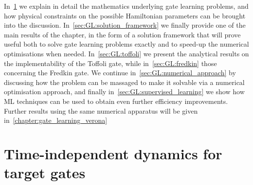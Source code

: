 In~\cref{sec:GL:problem_details} we explain in detail the mathematics underlying gate learning problems, and how physical constraints on the possible Hamiltonian parameters can be brought into the discussion. In~\cref{sec:GL:solution_framework} we finally provide one of the main results of the chapter, in the form of a solution framework that will prove useful both to solve gate learning problems exactly and to speed-up the numerical optimisations when needed. In~\cref{sec:GL:toffoli} we present the analytical results on the implementability of the Toffoli gate, while in~\cref{sec:GL:fredkin} those concerning the Fredkin gate. We continue in~\cref{sec:GL:numerical_approach} by discussing how the problem can be massaged to make it solvable via a numerical optimisation approach, and finally in~\cref{sec:GL:supervised_learning} we show how \ac{ML} techniques can be used to obtain even further efficiency improvements.
Further results using the same numerical apparatus will be given in~\cref{chapter:gate_learning_verona}


\section{Time-independent dynamics for target gates}
\label{sec:GL:problem_details}

